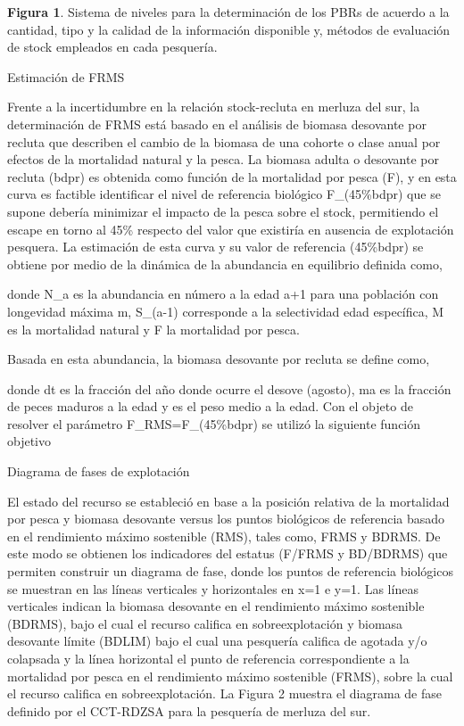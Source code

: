 \documentclass[
  spanish,
]{article}
\begin{document}
\small \textbf{Figura 1}. Sistema de niveles para la determinación de
los PBRs de acuerdo a la cantidad, tipo y la calidad de la información
disponible y, métodos de evaluación de stock empleados en cada
pesquería. \vspace{0.5cm} \normalsize

Estimación de FRMS

Frente a la incertidumbre en la relación stock-recluta en merluza del
sur, la determinación de FRMS está basado en el análisis de biomasa
desovante por recluta que describen el cambio de la biomasa de una
cohorte o clase anual por efectos de la mortalidad natural y la pesca.
La biomasa adulta o desovante por recluta (bdpr) es obtenida como
función de la mortalidad por pesca (F), y en esta curva es factible
identificar el nivel de referencia biológico F\_(45\%bdpr) que se supone
debería minimizar el impacto de la pesca sobre el stock, permitiendo el
escape en torno al 45\% respecto del valor que existiría en ausencia de
explotación pesquera. La estimación de esta curva y su valor de
referencia (45\%bdpr) se obtiene por medio de la dinámica de la
abundancia en equilibrio definida como,

donde N\_a es la abundancia en número a la edad a+1 para una población
con longevidad máxima m, S\_(a-1) corresponde a la selectividad edad
específica, M es la mortalidad natural y F la mortalidad por pesca.

Basada en esta abundancia, la biomasa desovante por recluta se define
como,

donde dt es la fracción del año donde ocurre el desove (agosto), ma es
la fracción de peces maduros a la edad y es el peso medio a la edad. Con
el objeto de resolver el parámetro F\_RMS=F\_(45\%bdpr) se utilizó la
siguiente función objetivo

Diagrama de fases de explotación

El estado del recurso se estableció en base a la posición relativa de la
mortalidad por pesca y biomasa desovante versus los puntos biológicos de
referencia basado en el rendimiento máximo sostenible (RMS), tales como,
FRMS y BDRMS. De este modo se obtienen los indicadores del estatus
(F/FRMS y BD/BDRMS) que permiten construir un diagrama de fase, donde
los puntos de referencia biológicos se muestran en las líneas verticales
y horizontales en x=1 e y=1. Las líneas verticales indican la biomasa
desovante en el rendimiento máximo sostenible (BDRMS), bajo el cual el
recurso califica en sobreexplotación y biomasa desovante límite (BDLIM)
bajo el cual una pesquería califica de agotada y/o colapsada y la línea
horizontal el punto de referencia correspondiente a la mortalidad por
pesca en el rendimiento máximo sostenible (FRMS), sobre la cual el
recurso califica en sobreexplotación. La Figura 2 muestra el diagrama de
fase definido por el CCT-RDZSA para la pesquería de merluza del sur.
\end{document}
